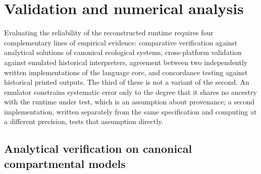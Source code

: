 \documentclass[3p,times,authoryear,twocolumn]{elsarticle}
\begin{document}
\section{Validation and numerical analysis}
\label{sec:validation}

Evaluating the reliability of the reconstructed runtime requires four complementary lines of empirical evidence: comparative verification against analytical solutions of canonical ecological systems, cross-platform validation against emulated historical interpreters, agreement between two independently written implementations of the language core, and concordance testing against historical printed outputs. The third of these is not a variant of the second. An emulator constrains systematic error only to the degree that it shares no ancestry with the runtime under test, which is an assumption about provenance; a second implementation, written separately from the same specification and computing at a different precision, tests that assumption directly.

\subsection{Analytical verification on canonical compartmental models}
\end{document}
